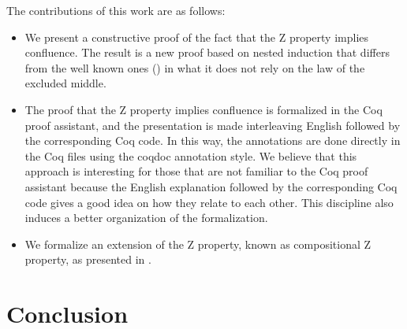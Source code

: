\documentclass[a4paper,UKenglish,cleveref, autoref, thm-restate,authorcolumns]{lipics-v2019}
\begin{document}
The contributions of this work are as follows:
\begin{itemize}
\item We present a constructive proof of the fact that the Z property
  implies confluence. The result is a new proof based on nested
  induction that differs from the well known ones
  (\cite{kes09,ZPropertyDraft}) in what it does not rely on the law of
  the excluded middle.
\item The proof that the Z property implies confluence is formalized
  in the Coq proof assistant, and the presentation is made
  interleaving English followed by the corresponding Coq code. In this
  way, the annotations are done directly in the Coq files using the
  coqdoc annotation style. We believe that this approach is
  interesting for those that are not familiar to the Coq proof
  assistant because the English explanation followed by the
  corresponding Coq code gives a good idea on how they relate to each
  other. This discipline also induces a better organization of the
  formalization.
\item We formalize an extension of the Z property, known as
  compositional Z property, as presented in
  \cite{Nakazawa-Fujita2016}.
\end{itemize}



\section{Conclusion}




\end{document}
